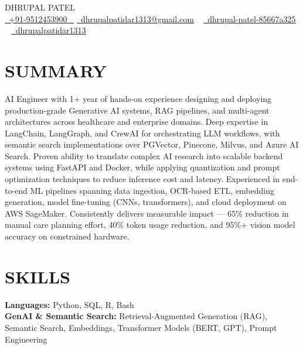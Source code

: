 \documentclass[letterpaper,10pt]{article}
\begin{document}
\begin{center}
    {\Huge \scshape DHRUPAL PATEL} \\ \vspace{3pt}
    \small \href{tel:+919512453900}{ \raisebox{-0.1\height}\faPhone\ \underline{+91-9512453900} ~} \href{mailto:dhrupalpatidar1313@gmail.com}{\raisebox{-0.2\height}\faEnvelope\  \underline{dhrupalpatidar1313@gmail.com}} ~ 
    \href{https://www.linkedin.com/in/dhrupal-patel-85667a325/}{\raisebox{-0.2\height}\faLinkedinSquare\ \underline{dhrupal-patel-85667a325}}  ~
    \href{https://github.com/dhrupalpatidar1313}{\raisebox{-0.2\height}\faGithub\ \underline{dhrupalpatidar1313}} ~
    \vspace{-6pt}
\end{center}


\section{SUMMARY}
\small{
AI Engineer with 1+ year of hands-on experience designing and deploying production-grade Generative AI systems, RAG pipelines, and multi-agent architectures across healthcare and enterprise domains. Deep expertise in LangChain, LangGraph, and CrewAI for orchestrating LLM workflows, with semantic search implementations over PGVector, Pinecone, Milvus, and Azure AI Search. Proven ability to translate complex AI research into scalable backend systems using FastAPI and Docker, while applying quantization and prompt optimization techniques to reduce inference cost and latency. Experienced in end-to-end ML pipelines spanning data ingestion, OCR-based ETL, embedding generation, model fine-tuning (CNNs, transformers), and cloud deployment on AWS SageMaker. Consistently delivers measurable impact --- 65\% reduction in manual care planning effort, 40\% token usage reduction, and 95\%+ vision model accuracy on constrained hardware.
}
\vspace{-4pt}


\section{SKILLS}

\textbf{Languages:} Python, SQL, R, Bash \\

\textbf{GenAI \& Semantic Search:} Retrieval-Augmented Generation (RAG), Semantic Search, Embeddings, Transformer Models (BERT, GPT), Prompt Engineering \\
\end{document}
